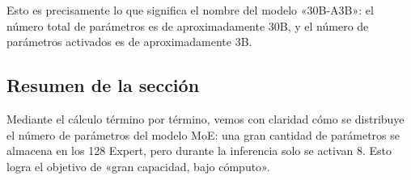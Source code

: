 Esto es precisamente lo que significa el nombre del modelo «30B-A3B»: el número total de parámetros es de aproximadamente 30B, y el número de parámetros activados es de aproximadamente 3B.

\subsection{Resumen de la sección}

Mediante el cálculo término por término, vemos con claridad cómo se distribuye el número de parámetros del modelo MoE: una gran cantidad de parámetros se almacena en los 128 Expert, pero durante la inferencia solo se activan 8. Esto logra el objetivo de «gran capacidad, bajo cómputo».

